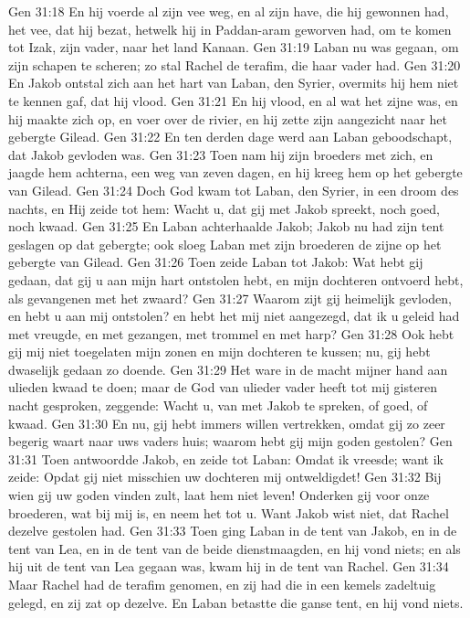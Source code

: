 Gen 31:18  En hij voerde al zijn vee weg, en al zijn have, die hij gewonnen had, het vee, dat hij bezat, hetwelk hij in Paddan-aram geworven had, om te komen tot Izak, zijn vader, naar het land Kanaan.
Gen 31:19  Laban nu was gegaan, om zijn schapen te scheren; zo stal Rachel de terafim, die haar vader had.
Gen 31:20  En Jakob ontstal zich aan het hart van Laban, den Syrier, overmits hij hem niet te kennen gaf, dat hij vlood.
Gen 31:21  En hij vlood, en al wat het zijne was, en hij maakte zich op, en voer over de rivier, en hij zette zijn aangezicht naar het gebergte Gilead.
Gen 31:22  En ten derden dage werd aan Laban geboodschapt, dat Jakob gevloden was.
Gen 31:23  Toen nam hij zijn broeders met zich, en jaagde hem achterna, een weg van zeven dagen, en hij kreeg hem op het gebergte van Gilead.
Gen 31:24  Doch God kwam tot Laban, den Syrier, in een droom des nachts, en Hij zeide tot hem: Wacht u, dat gij met Jakob spreekt, noch goed, noch kwaad.
Gen 31:25  En Laban achterhaalde Jakob; Jakob nu had zijn tent geslagen op dat gebergte; ook sloeg Laban met zijn broederen de zijne op het gebergte van Gilead.
Gen 31:26  Toen zeide Laban tot Jakob: Wat hebt gij gedaan, dat gij u aan mijn hart ontstolen hebt, en mijn dochteren ontvoerd hebt, als gevangenen met het zwaard?
Gen 31:27  Waarom zijt gij heimelijk gevloden, en hebt u aan mij ontstolen? en hebt het mij niet aangezegd, dat ik u geleid had met vreugde, en met gezangen, met trommel en met harp?
Gen 31:28  Ook hebt gij mij niet toegelaten mijn zonen en mijn dochteren te kussen; nu, gij hebt dwaselijk gedaan zo doende.
Gen 31:29  Het ware in de macht mijner hand aan ulieden kwaad te doen; maar de God van ulieder vader heeft tot mij gisteren nacht gesproken, zeggende: Wacht u, van met Jakob te spreken, of goed, of kwaad.
Gen 31:30  En nu, gij hebt immers willen vertrekken, omdat gij zo zeer begerig waart naar uws vaders huis; waarom hebt gij mijn goden gestolen?
Gen 31:31  Toen antwoordde Jakob, en zeide tot Laban: Omdat ik vreesde; want ik zeide: Opdat gij niet misschien uw dochteren mij ontweldigdet!
Gen 31:32  Bij wien gij uw goden vinden zult, laat hem niet leven! Onderken gij voor onze broederen, wat bij mij is, en neem het tot u. Want Jakob wist niet, dat Rachel dezelve gestolen had.
Gen 31:33  Toen ging Laban in de tent van Jakob, en in de tent van Lea, en in de tent van de beide dienstmaagden, en hij vond niets; en als hij uit de tent van Lea gegaan was, kwam hij in de tent van Rachel.
Gen 31:34  Maar Rachel had de terafim genomen, en zij had die in een kemels zadeltuig gelegd, en zij zat op dezelve. En Laban betastte die ganse tent, en hij vond niets.
